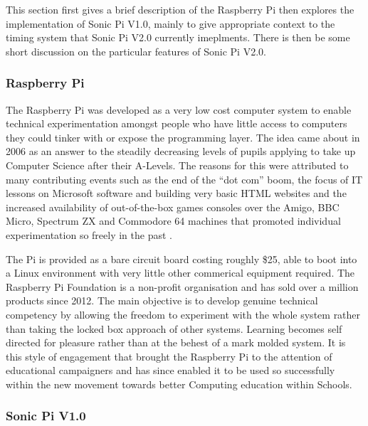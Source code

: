 \documentclass[11pt]{scrartcl}
\begin{document}
This section first gives a brief description of the Raspberry Pi then explores 
the implementation of Sonic Pi V1.0, mainly to give appropriate context to the 
timing system that Sonic Pi V2.0 currently imeplments. There is then be some 
short discussion on the particular features of Sonic Pi V2.0.

\subsubsection{Raspberry Pi}
The Raspberry Pi was developed as a very low cost computer system to enable 
technical experimentation amongst people who have little access to computers 
they could tinker with or expose the programming layer. The idea came about in 
2006 as an answer to the steadily decreasing levels of pupils applying to take 
up Computer Science after their A-Levels. The reasons for this were attributed 
to many contributing events such as the end of the ``dot com'' boom, the focus 
of IT lessons on Microsoft software and building very basic HTML websites and 
the increased availability of out-of-the-box games consoles over the Amigo, BBC 
Micro, Spectrum ZX and Commodore 64 machines that promoted individual 
experimentation so freely in the past \cite{rp}.

The Pi is provided as a bare circuit board costing roughly \$25, able to boot 
into a Linux environment with very little other commerical equipment required. 
The Raspberry Pi Foundation is a non-profit organisation and has sold over a 
million products since 2012. The main objective is to develop genuine 
technical competency by allowing the freedom to experiment with the whole 
system rather than taking the locked box approach of other systems. Learning 
becomes self directed for pleasure rather than at the behest of a mark molded 
system. It is this style of engagement that brought the Raspberry Pi to the 
attention of educational campaigners and has since enabled it to be used so 
successfully within the new movement towards better Computing education within 
Schools. 

\subsubsection{Sonic Pi V1.0}
\end{document}
